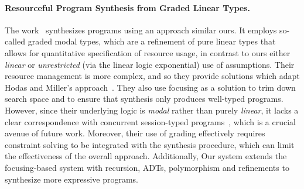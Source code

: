 \documentclass{llncs}
\newcommand{\lolli}{\multimap}
\newcommand{\tensor}{\otimes}
\newcommand{\one}{\mathbf{1}}
\newcommand{\bang}{{!}}
\newcommand{\mypara}[1]{\paragraph{\textbf{#1}.}}
\begin{document}
\mypara{Resourceful Program Synthesis from Graded Linear Types} The
work~\cite{DBLP:conf/lopstr/HughesO20} synthesizes programs using an
approach similar ours. It employs so-called graded
modal types, which are a refinement of pure linear types
that allows for quantitative
specification of resource usage, in contrast to ours either
\emph{linear} or \emph{unrestricted} (via the linear logic
exponential) use of assumptions. Their resource management is more
complex, and so they provide solutions which adapt Hodas and Miller's
approach~\cite{DBLP:journals/tcs/CervesatoHP00,DBLP:journals/tcs/LiangM09}.
%
They also use focusing as a solution to trim down search space and to
ensure that synthesis only produces well-typed programs. However, since their
underlying logic is \emph{modal} rather than purely \emph{linear}, it
lacks a clear correspondence with concurrent session-typed
programs~\cite{DBLP:journals/mscs/CairesPT16,DBLP:conf/concur/CairesP10},
which is a crucial avenue of future work. Moreover, their use of grading
effectively requires constraint solving to be integrated with the
synthesis procedure, which can limit the effectiveness of the overall
approach.
Additionally, Our system extends the focusing-based system with
recursion, ADTs, polymorphism and refinements to synthesize
more expressive programs.




\end{document}
